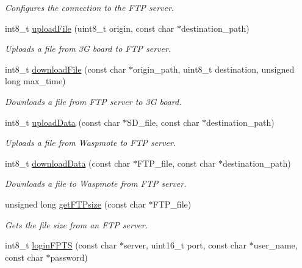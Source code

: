 \begin{DoxyCompactItemize}
\begin{DoxyCompactList}\small\item\em Configures the connection to the F\+TP server. \end{DoxyCompactList}\item 
int8\+\_\+t \hyperlink{class_wasp3_g_a937ed276980ce63ce1cf4560c0194cfe}{upload\+File} (uint8\+\_\+t origin, const char $\ast$destination\+\_\+path)
\begin{DoxyCompactList}\small\item\em Uploads a file from 3G board to F\+TP server. \end{DoxyCompactList}\item 
int8\+\_\+t \hyperlink{class_wasp3_g_abda50b5af1faa757608d6a3dcbe35d73}{download\+File} (const char $\ast$origin\+\_\+path, uint8\+\_\+t destination, unsigned long max\+\_\+time)
\begin{DoxyCompactList}\small\item\em Downloads a file from F\+TP server to 3G board. \end{DoxyCompactList}\item 
int8\+\_\+t \hyperlink{class_wasp3_g_ae18cfbe432259226d37b39099041bc36}{upload\+Data} (const char $\ast$S\+D\+\_\+file, const char $\ast$destination\+\_\+path)
\begin{DoxyCompactList}\small\item\em Uploads a file from Waspmote to F\+TP server. \end{DoxyCompactList}\item 
int8\+\_\+t \hyperlink{class_wasp3_g_a28c567b8cd5030a8d22571c679de302f}{download\+Data} (const char $\ast$F\+T\+P\+\_\+file, const char $\ast$destination\+\_\+path)
\begin{DoxyCompactList}\small\item\em Downloads a file to Waspmote from F\+TP server. \end{DoxyCompactList}\item 
unsigned long \hyperlink{class_wasp3_g_ab17e5ab9bbb4bc9df9cc0f8ccd7afaa9}{get\+F\+T\+Psize} (const char $\ast$F\+T\+P\+\_\+file)
\begin{DoxyCompactList}\small\item\em Gets the file size from an F\+TP server. \end{DoxyCompactList}\item 
int8\+\_\+t \hyperlink{class_wasp3_g_ab3d3f7d773beb0a01fad60da0d779dc9}{login\+F\+P\+TS} (const char $\ast$server, uint16\+\_\+t port, const char $\ast$user\+\_\+name, const char $\ast$password)

\end{DoxyCompactItemize}
